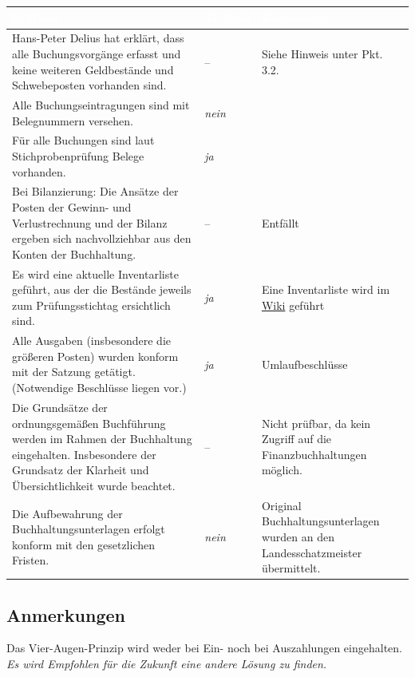 \documentclass[%
	titlepage,oneside,12pt,headlines=1.5,numbers=noenddot, chapterprefix=false,parskip=full-,DIV=14,pagesize]{scrreprt}
\begin{document}
\begin{longtable}[ht]{|p{} p{} p{}|}
\hline\rowcolor{pirateorange} 
	\footnotesize\textcolor{white}{\textbf{Prüfung}} & \footnotesize\textcolor{white}{\textbf{Ja/Nein}} & \footnotesize\textcolor{white}{\textbf{Kommentar}}\\\endhead
        \scriptsize Hans-Peter Delius hat erklärt, dass alle Buchungsvorgänge erfasst und keine weiteren Geldbestände und Schwebeposten vorhanden sind. & \scriptsize \textit{} -- & \scriptsize Siehe Hinweis unter Pkt. 3.2. \\
        \scriptsize Alle Buchungseintragungen sind mit Belegnummern versehen. & \scriptsize \textit{nein} & \scriptsize \\
        \scriptsize Für alle Buchungen sind laut Stichprobenprüfung Belege vorhanden. & \scriptsize \textit{ja} & \scriptsize \\
        \scriptsize Bei Bilanzierung: Die Ansätze der Posten der Gewinn- und Verlustrechnung und der Bilanz ergeben sich nachvollziehbar aus den Konten der Buchhaltung. & \scriptsize \textit{} -- & \scriptsize Entfällt \\
        \scriptsize Es wird eine aktuelle Inventarliste geführt, aus der die Bestände jeweils zum Prüfungsstichtag ersichtlich sind. & \scriptsize \textit{ja} & \scriptsize Eine Inventarliste wird im \href{http://wiki.piratenbrandenburg.de/Dahme-Oder-Spree/Vorstand/Organisation}{Wiki} geführt \\
        \scriptsize Alle Ausgaben (insbesondere die größeren Posten) wurden konform mit der Satzung getätigt. (Notwendige Beschlüsse liegen vor.) & \scriptsize \textit{ja} & \scriptsize Umlaufbeschlüsse \\
        \scriptsize Die Grundsätze der ordnungsgemäßen Buchführung werden im Rahmen der Buchhaltung eingehalten. Insbesondere der Grundsatz der Klarheit und Übersichtlichkeit wurde beachtet. & \scriptsize \textit{} -- & \scriptsize Nicht prüfbar, da kein Zugriff auf die Finanzbuchhaltungen möglich. \\
        \scriptsize Die Aufbewahrung der Buchhaltungsunterlagen erfolgt konform mit den gesetzlichen Fristen. & \scriptsize \textit{nein} & \scriptsize Original Buchhaltungsunterlagen wurden an den Landesschatzmeister übermittelt.\\
\hline
\end{longtable}
\subsection{Anmerkungen}
Das Vier-Augen-Prinzip wird weder bei Ein- noch bei Auszahlungen eingehalten.\newline
\textit{Es wird Empfohlen für die Zukunft eine andere Lösung zu finden.}
\end{document}

